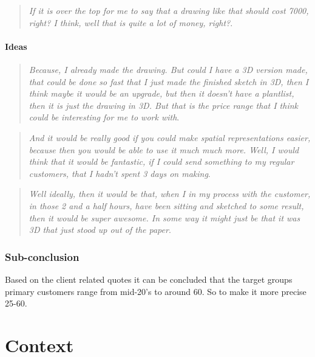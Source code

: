 		\begin{quote}
			\textit{If it is over the top for me to say that a drawing like that should cost 7000, right? I think, well that is quite a lot of money, right?}\label{def:expertQuote12}.\\
		\end{quote}
		
		\paragraph*{Ideas}
		\begin{quote}
			\textit{Because, I already made the drawing. But could I have a 3D version made, that could be done so fast that I just made the finished sketch in 3D, then I think maybe it would be an upgrade, but then it doesn't have a plantlist, then it is just the drawing in 3D. But that is the price range that I think could be interesting for me to work with}\label{def:expertQuote13}.\\
		\end{quote}
		
		\begin{quote}
			\textit{And it would be really good if you could make spatial representations easier, because then you would be able to use it much much more. Well, I would think that it would be fantastic, if I could send something to my regular customers, that I hadn't spent 3 days on making}\label{def:expertQuote14}.\\
		\end{quote}
	
		\begin{quote}
			\textit{Well ideally, then it would be that, when I in my process with the customer, in those 2 and a half hours, have been sitting and sketched to some result, then it would be super awesome. In some way it might just be that it was 3D that just stood up out of the paper}\label{def:expertQuote15}.\\
		\end{quote}
		
		\subsubsection{Sub-conclusion}
		Based on the client related quotes it can be concluded that the target groups primary customers range from mid-20's to around 60. So to make it more precise 25-60.



	\section{Context}
		
